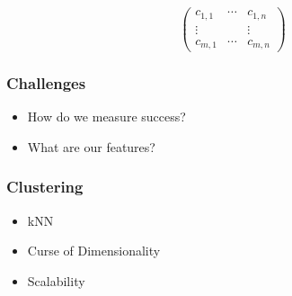 \begin{frame}
{\begin{displaymath}
\begin{pmatrix}
        c_{1,1} & \cdots & c_{1,n} \\
        \vdots & & \vdots \\
        c_{m,1} & \cdots & c_{m,n}
      \end{pmatrix}
    \end{displaymath}
  }
  
\end{frame}

\begin{frame}
  \frametitle{Challenges}

  \begin{itemize}
  \item How do we measure success?
  \item What are our features?
  \end{itemize}
\end{frame}

\begin{frame}
  \frametitle{Clustering}

  \begin{itemize}
  \item kNN 
  \item Curse of Dimensionality
  \item Scalability 
  \end{itemize}
\end{frame}

\begin{frame}
  \vspace{-10.2cm}
\end{frame}

